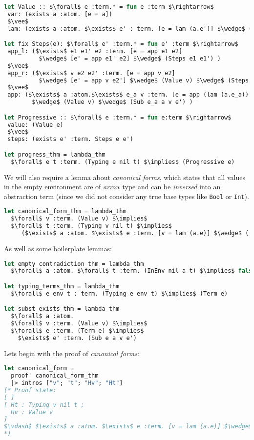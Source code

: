 \documentclass[english, mgr]{iithesis}
\renewcommand{\tt}[1]{\texttt{\small{#1}}}
\renewcommand{\it}[1]{\textit{#1}}
\begin{document}
\begin{lstlisting}[mathescape,language=OCaml]
let Value :: $\forall$ e :term.* = fun e :term $\rightarrow$
 var: (exists a :atom. [e = a])
 $\vee$
 lam: (exists a :atom. $\exists$ e' : term. [e = lam (a.e')] $\wedge$ (Term e'))

let fix Steps(e): $\forall$ e' :term.* = fun e' :term $\rightarrow$
 app_l: ($\exists$ e1 e1' e2 :term. [e = app e1 e2]
          $\wedge$ [e' = app e1' e2] $\wedge$ (Steps e1 e1') )
 $\vee$
 app_r: ($\exists$ v e2 e2' :term. [e = app v e2]
          $\wedge$ [e' = app v e2'] $\wedge$ (Value v) $\wedge$ (Steps e2 e2') )
 $\vee$
 app: ($\exists$ a :atom.$\exists$ e_a v :term. [e = app (lam (a.e_a)) v]
        $\wedge$ (Value v) $\wedge$ (Sub e_a a v e') )

let Progressive :: $\forall$ e :term.* = fun e:term $\rightarrow$
 value: (Value e)
 $\vee$
 steps: (exists e' :term. Steps e e')

let progress_thm = lambda_thm
  $\forall$ e t :term. (Typing e nil t) $\implies$ (Progressive e)
\end{lstlisting}
We will also require a lemma about \it{canonical forms},
which states that all values in the empty environment
are of \it{arrow} type and can be \it{inversed} into an abstraction term
(since we did not consider any true base types like \tt{Bool} or \tt{Int}).
\begin{lstlisting}[mathescape,language=OCaml]
let canonical_form_thm = lambda_thm
  $\forall$ v :term. (Value v) $\implies$
  $\forall$ t :term. (Typing v nil t) $\implies$
     ($\exists$ a :atom. $\exists$ e :term. [v = lam (a.e)] $\wedge$ (Term e))
\end{lstlisting}
As well as some boilerplate lemmas:
\begin{lstlisting}[mathescape,language=OCaml]
let empty_contradiction_thm = lambda_thm
  $\forall$ a :atom. $\forall$ t :term. (InEnv nil a t) $\implies$ false

let typing_terms_thm = lambda_thm
  $\forall$ e env t : term. (Typing e env t) $\implies$ (Term e)

let subst_exists_thm = lambda_thm
  $\forall$ a :atom.
  $\forall$ v :term. (Value v) $\implies$
  $\forall$ e :term. (Term e) $\implies$
    $\exists$ e' :term. (Sub e a v e')
\end{lstlisting}
Lets begin with the proof of \it{canonical forms}:
\begin{lstlisting}[mathescape,language=OCaml]
let canonical_form =
  proof' canonical_form_thm
  |> intros ["v"; "t"; "Hv"; "Ht"]
(* Proof state:
[ ]
[ Ht : Typing v nil t ;
  Hv : Value v
]
$\vdash$ $\exists$ a :atom. $\exists$ e :term. [v = lam (a.e)] $\wedge$ Term e
*)
\end{lstlisting}
\end{document}
